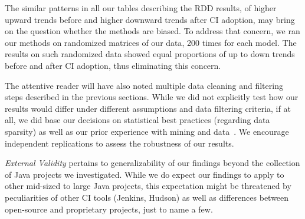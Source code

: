  The similar patterns in all our tables describing the RDD results, of higher upward trends before and higher downward trends after CI adoption, may bring on the question whether the methods are biased. To address that concern, we ran our methods on randomized matrices of our data, 200 times for each model. The results on such randomized data showed equal proportions of up to down trends before and after CI adoption, thus eliminating this concern.
 
 
The attentive reader will have also noted multiple data cleaning and filtering 
steps described in the previous sections.
While we did not explicitly test how our results would differ under different
assumptions and data filtering criteria, if at all, we did base our decisions on
statistical best practices (\eg regarding data sparsity) as well as our prior
experience with mining \GH and \Tvis data~\cite{yue2015wait, VasilescuYWDF15}.
We encourage independent replications to assess the robustness of our results.
 


\smallskip \emph{External Validity} pertains to generalizability of our findings 
beyond the collection of \GH Java projects we investigated.
While we do expect our findings to apply to other mid-sized to large Java projects,
this expectation might be threatened by peculiarities of other CI tools (\eg Jenkins, 
Hudson) as well as differences between open-source and proprietary projects, just
to name a few.

